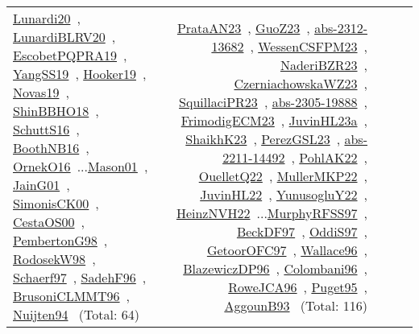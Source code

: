 {\begin{longtable}{p{3cm}r>{\raggedright\arraybackslash}p{6cm}>{\raggedright\arraybackslash}p{6cm}>{\raggedright\arraybackslash}p{8cm}}
\href{../works/Lunardi20.pdf}{Lunardi20}~\cite{Lunardi20}, \href{../works/LunardiBLRV20.pdf}{LunardiBLRV20}~\cite{LunardiBLRV20}, \href{../works/EscobetPQPRA19.pdf}{EscobetPQPRA19}~\cite{EscobetPQPRA19}, \href{../works/YangSS19.pdf}{YangSS19}~\cite{YangSS19}, \href{../works/Hooker19.pdf}{Hooker19}~\cite{Hooker19}, \href{../works/Novas19.pdf}{Novas19}~\cite{Novas19}, \href{../works/ShinBBHO18.pdf}{ShinBBHO18}~\cite{ShinBBHO18}, \href{../works/SchuttS16.pdf}{SchuttS16}~\cite{SchuttS16}, \href{../works/BoothNB16.pdf}{BoothNB16}~\cite{BoothNB16}, \href{../works/OrnekO16.pdf}{OrnekO16}~\cite{OrnekO16}...\href{../works/Mason01.pdf}{Mason01}~\cite{Mason01}, \href{../works/JainG01.pdf}{JainG01}~\cite{JainG01}, \href{../works/SimonisCK00.pdf}{SimonisCK00}~\cite{SimonisCK00}, \href{../works/CestaOS00.pdf}{CestaOS00}~\cite{CestaOS00}, \href{../works/PembertonG98.pdf}{PembertonG98}~\cite{PembertonG98}, \href{../works/RodosekW98.pdf}{RodosekW98}~\cite{RodosekW98}, \href{../works/Schaerf97.pdf}{Schaerf97}~\cite{Schaerf97}, \href{../works/SadehF96.pdf}{SadehF96}~\cite{SadehF96}, \href{../works/BrusoniCLMMT96.pdf}{BrusoniCLMMT96}~\cite{BrusoniCLMMT96}, \href{../works/Nuijten94.pdf}{Nuijten94}~\cite{Nuijten94} (Total: 64) & \href{../works/PrataAN23.pdf}{PrataAN23}~\cite{PrataAN23}, \href{../works/GuoZ23.pdf}{GuoZ23}~\cite{GuoZ23}, \href{../works/abs-2312-13682.pdf}{abs-2312-13682}~\cite{abs-2312-13682}, \href{../works/WessenCSFPM23.pdf}{WessenCSFPM23}~\cite{WessenCSFPM23}, \href{../works/NaderiBZR23.pdf}{NaderiBZR23}~\cite{NaderiBZR23}, \href{../works/CzerniachowskaWZ23.pdf}{CzerniachowskaWZ23}~\cite{CzerniachowskaWZ23}, \href{../works/SquillaciPR23.pdf}{SquillaciPR23}~\cite{SquillaciPR23}, \href{../works/abs-2305-19888.pdf}{abs-2305-19888}~\cite{abs-2305-19888}, \href{../works/FrimodigECM23.pdf}{FrimodigECM23}~\cite{FrimodigECM23}, \href{../works/JuvinHL23a.pdf}{JuvinHL23a}~\cite{JuvinHL23a}, \href{../works/ShaikhK23.pdf}{ShaikhK23}~\cite{ShaikhK23}, \href{../works/PerezGSL23.pdf}{PerezGSL23}~\cite{PerezGSL23}, \href{../works/abs-2211-14492.pdf}{abs-2211-14492}~\cite{abs-2211-14492}, \href{../works/PohlAK22.pdf}{PohlAK22}~\cite{PohlAK22}, \href{../works/OuelletQ22.pdf}{OuelletQ22}~\cite{OuelletQ22}, \href{../works/MullerMKP22.pdf}{MullerMKP22}~\cite{MullerMKP22}, \href{../works/JuvinHL22.pdf}{JuvinHL22}~\cite{JuvinHL22}, \href{../works/YunusogluY22.pdf}{YunusogluY22}~\cite{YunusogluY22}, \href{../works/HeinzNVH22.pdf}{HeinzNVH22}~\cite{HeinzNVH22}...\href{../works/MurphyRFSS97.pdf}{MurphyRFSS97}~\cite{MurphyRFSS97}, \href{../works/BeckDF97.pdf}{BeckDF97}~\cite{BeckDF97}, \href{../works/OddiS97.pdf}{OddiS97}~\cite{OddiS97}, \href{../works/GetoorOFC97.pdf}{GetoorOFC97}~\cite{GetoorOFC97}, \href{../works/Wallace96.pdf}{Wallace96}~\cite{Wallace96}, \href{../works/BlazewiczDP96.pdf}{BlazewiczDP96}~\cite{BlazewiczDP96}, \href{../works/Colombani96.pdf}{Colombani96}~\cite{Colombani96}, \href{../works/RoweJCA96.pdf}{RoweJCA96}~\cite{RoweJCA96}, \href{../works/Puget95.pdf}{Puget95}~\cite{Puget95}, \href{../works/AggounB93.pdf}{AggounB93}~\cite{AggounB93} (Total: 116)\\

\end{longtable}}
